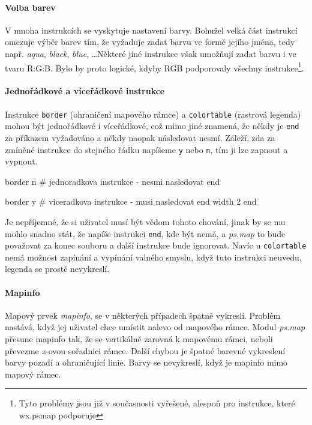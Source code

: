 \documentclass[a4paper,12pt,draft]{article}
\newcommand{\modul}[1]{\emph{#1}}
\newcommand{\instr}[1]{\lstinline[style=psmapInline]|#1|}
\begin{document}
\paragraph*{Volba barev}
\label{sec:psmap:color}
V mnoha instrukcích se vyskytuje nastavení barvy. Bohužel velká část instrukcí omezuje výběr barev tím, že vyžaduje zadat barvu ve formě jejího jména, tedy např. \emph{aqua}, \emph{black}, \emph{blue}, \ldots Některé jiné instrukce však umožňují zadat barvu i ve tvaru R:G:B. Bylo by proto logické, kdyby RGB podporovaly všechny instrukce\footnote{Tyto problémy jsou již v současnosti vyřešené, alespoň pro instrukce, které wx.psmap podporuje}. 

\paragraph*{Jednořádkové a víceřádkové instrukce}
\label{sec:psmap:singleline}
Instrukce \instr{border} (ohraničení mapového rámce) a \instr{colortable} (rastrová legenda) mohou být jednořádkové i víceřádkové, což mimo jiné znamená, že někdy je \instr{end} za příkazem vyžadováno a někdy naopak následovat nesmí. Záleží, zda za zmíněné instrukce do stejného řádku napíšeme \instr{y} nebo \instr{n}, tím ji lze zapnout a vypnout.
\begin{psmap}
border n    # jednoradkova instrukce - nesmi nasledovat end

border y    # viceradkova instrukce - musi nasledovat end
   width 2
end
\end{psmap}
Je nepříjemné, že si uživatel musí být vědom tohoto chování, jinak by se mu mohlo snadno stát, že napíše instrukci \instr{end}, kde být nemá, a \modul{ps.map} to bude považovat za konec souboru a další instrukce bude ignorovat.
Navíc u \instr{colortable} nemá možnost zapínání a vypínání valného smyslu, když tuto instrukci neuvedu, legenda se prostě nevykreslí.

\paragraph*{Mapinfo}
\label{sec:psmap:mapinfo}
Mapový prvek \emph{mapinfo}, se v některých případech špatně vykreslí. Problém nastává, když jej uživatel chce umístit nalevo od mapového rámce. Modul \modul{ps.map} přesune mapinfo tak, že se vertikálně zarovná k mapovému rámci, neboli převezme \emph{x}-ovou sořadnici rámce. Další chybou je špatné barevné vykreslení barvy pozadí a ohraničující linie. Barvy se nevykreslí, když je mapinfo  mimo mapový rámec.
\end{document}
